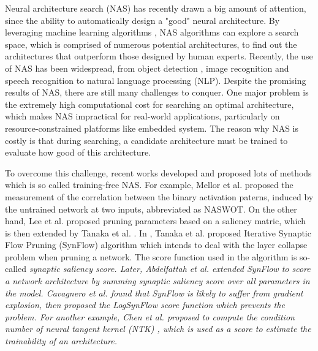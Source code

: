 \documentclass[sigconf]{acmart}
\begin{document}
    Neural architecture search (NAS) has recently drawn a big amount of 
    attention, since the ability to automatically design a "good" neural 
    architecture. By leveraging machine learning algorithms 
    \cite{https://doi.org/10.48550/arxiv.1611.01578}, NAS algorithms can 
    explore a search space, which is comprised of numerous potential 
    architectures, to find out the architectures that outperform those 
    designed by human experts. Recently, the use of NAS has been widespread, 
    from object detection \cite{https://doi.org/10.48550/arxiv.2111.13336}, 
    image recognition \cite{https://doi.org/10.48550/arxiv.2006.04647} 
    and speech recognition \cite{https://doi.org/10.48550/arxiv.2011.05649} 
    \cite{mehrotra2021nasbenchasr} to natural language processing (NLP). 
    \cite{jiang-etal-2019-improved} \cite{https://doi.org/10.48550/arxiv.2006.07116} 
    \cite{https://doi.org/10.48550/arxiv.2005.14187} 
    Despite the promising results of NAS, there are still many challenges 
    to conquer. One major problem is the extremely high computational 
    cost for searching an optimal architecture, which makes NAS 
    impractical for real-world applications, particularly on resource-constrained 
    platforms like embedded system. The reason why NAS is costly is that 
    during searching, a candidate architecture must be trained to 
    evaluate how good of this architecture. 

    To overcome this challenge, recent works developed and proposed lots 
    of methods which is so called training-free NAS. 
    For example, Mellor et al. \cite{https://doi.org/10.48550/arxiv.2006.04647} 
    proposed the measurement of the correlation between the binary 
    activation paterns, induced by the untrained network at two inputs, 
    abbreviated as NASWOT. 
    On the other hand, Lee et al. \cite{lee2019snip} proposed pruning 
    parameters based on a saliency matric, which is then extended by Tanaka 
    et al. \cite{tanaka2020pruning}. In \cite{tanaka2020pruning}, Tanaka 
    et al. proposed Iterative Synaptic Flow Pruning (SynFlow) algorithm 
    which intends to deal with the layer collapse problem when pruning a 
    network. The score function used in the algorithm is so-called 
    \it{synaptic saliency} \rm{score}. Later, Abdelfattah et al. 
    \cite{abdelfattah2021zerocost} extended SynFlow to score a network 
    architecture by summing synaptic saliency score over all parameters 
    in the model. Cavagnero et al. \cite{Cavagnero_2023} found that 
    SynFlow is likely to suffer from gradient explosion, then proposed 
    the LogSynFlow score function which prevents the problem. 
    For another example, Chen et al. 
    \cite{https://doi.org/10.48550/arxiv.2102.11535} proposed to compute 
    the condition number of neural tangent kernel (NTK) 
    \cite{https://doi.org/10.48550/arxiv.2203.09137} 
    \cite{https://doi.org/10.48550/arxiv.2109.00817}, which is used as 
    a score to estimate the trainability of an architecture. 
\end{document}
